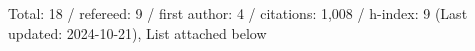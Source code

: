 Total: 18 / refereed: 9 / first author: 4 / citations: 1,008 / h-index: 9 (Last updated: 2024-10-21), List attached below